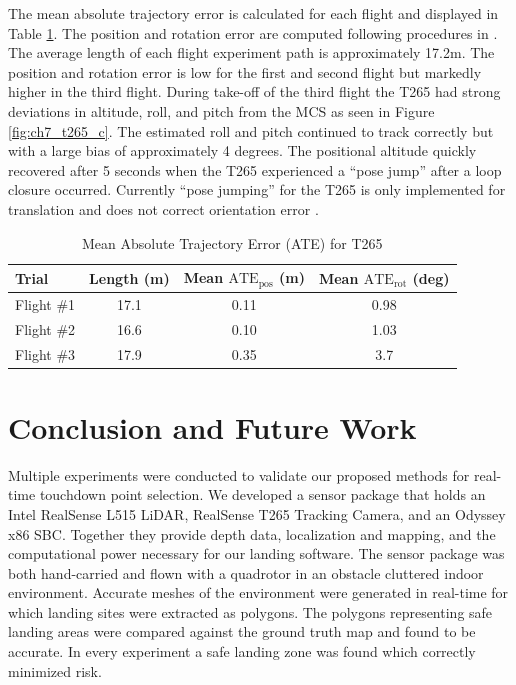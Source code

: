 The mean absolute trajectory error is calculated for each flight and displayed in Table \ref{table:ch7_ate}. The position and rotation error are computed following procedures in \cite{zhang_tutorial_2018}. The average length of each flight experiment path is approximately 17.2m. The position and rotation error is low for the first and second flight but markedly higher in the third flight. During take-off of the third flight the T265 had strong deviations in altitude, roll, and pitch from the \ac{MCS} as seen in Figure \ref{fig:ch7_t265_c}. The estimated roll and pitch continued to track correctly but with a large bias of approximately 4 degrees.  The positional altitude quickly recovered after 5 seconds when the T265 experienced a ``pose jump'' after a loop closure occurred. Currently ``pose jumping'' for the T265 is only implemented for translation and does not correct orientation error \cite{realsense_github_t265}.

\begin{table}[h]
\centering
\caption{Mean Absolute Trajectory Error (ATE) for T265}\label{table:ch7_ate}
\begin{tabular}{@{}lccc@{}}
\toprule
Trial    & Length (m) & Mean $\textrm{ATE}_{\textrm{pos}}$ (m) & Mean $\textrm{ATE}_{\textrm{rot}}$ (deg) \\ \midrule
Flight \#1 & 17.1       & 0.11                  & 0.98                    \\
Flight \#2 & 16.6       & 0.10                  & 1.03                    \\
Flight \#3 & 17.9       & 0.35                  & 3.7                     \\ \bottomrule
\end{tabular}
\end{table}


\section{Conclusion and Future Work}

Multiple experiments were conducted to validate our proposed methods for real-time touchdown point selection. We developed a sensor package that holds an Intel RealSense L515 LiDAR, RealSense T265 Tracking Camera, and an Odyssey x86 \acf{SBC}. Together they provide depth data, localization and mapping, and the computational power necessary for our landing software. The sensor package was both hand-carried and flown with a quadrotor in an obstacle cluttered indoor environment. Accurate meshes of the environment were generated in real-time for which landing sites were extracted as polygons. The polygons representing safe landing areas were compared against the ground truth map and found to be accurate. In every experiment a safe landing zone was found which correctly minimized risk. 

